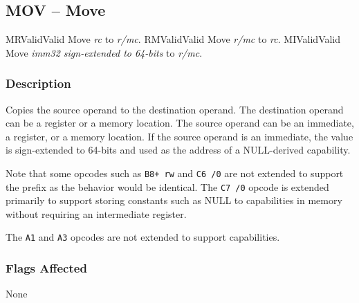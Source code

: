 \clearpage
{}
{}
\subsection*{MOV -- Move}

\begin{x86opcodetable}
  {MR}{Valid}{Valid}
  {Move \emph{rc} to \emph{r/mc}.}
  {RM}{Valid}{Valid}
  {Move \emph{r/mc} to \emph{rc}.}
  {MI}{Valid}{Valid}
  {Move \emph{imm32 sign-extended to 64-bits} to \emph{r/mc}.}
\end{x86opcodetable}

\begin{x86opentable}
\end{x86opentable}

\subsubsection*{Description}

Copies the source operand to the destination operand. The destination
operand can be a register or a memory location. The source operand can
be an immediate, a register, or a memory location.  If the source
operand is an immediate, the value is sign-extended to 64-bits and
used as the address of a NULL-derived capability.

Note that some  opcodes such as \texttt{B8+ rw} and
\texttt{C6 /0} are not extended to support the  prefix
as the behavior would be identical.  The \texttt{C7 /0} opcode is
extended primarily to support storing constants such as NULL to
capabilities in memory without requiring an intermediate register.

The \texttt{A1} and \texttt{A3} opcodes are not extended to support
capabilities.

\subsubsection*{Flags Affected}

None
